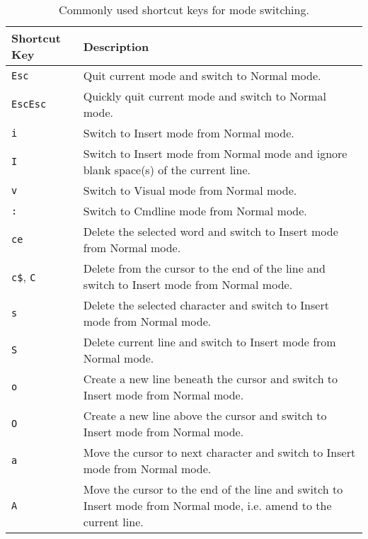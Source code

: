 \documentclass[a4paper]{article}
\begin{document}
\begin{table}
  \centering \caption{Commonly used shortcut keys for mode switching.}\label{tab:SKeyModeSwitch}
  \begin{tabularx}{\textwidth}{lX}
    \hline
    Shortcut Key & Description \\ \hline
    \texttt{Esc} & Quit current mode and switch to Normal mode. \\ \hdashline
    \texttt{Esc}\texttt{Esc} & Quickly quit current mode and switch to Normal mode. \\ \hdashline
    \texttt{i} & Switch to Insert mode from Normal mode. \\ \hdashline
    \texttt{I} & Switch to Insert mode from Normal mode and ignore blank space(s) of the current line. \\ \hdashline
    \texttt{v} & Switch to Visual mode from Normal mode. \\ \hdashline
    \texttt{:} & Switch to Cmdline mode from Normal mode. \\ \hdashline
    \texttt{ce} & Delete the selected word and switch to Insert mode from Normal mode. \\ \hdashline
    \texttt{c\$}, \texttt{C} & Delete from the cursor to the end of the line and switch to Insert mode from Normal mode. \\ \hdashline
    \texttt{s} & Delete the selected character and switch to Insert mode from Normal mode. \\ \hdashline
    \texttt{S} & Delete current line and switch to Insert mode from Normal mode. \\ \hdashline
    \texttt{o} & Create a new line beneath the cursor and switch to Insert mode from Normal mode. \\ \hdashline
    \texttt{O} & Create a new line above the cursor and switch to Insert mode from Normal mode. \\ \hdashline
    \texttt{a} & Move the cursor to next character and switch to Insert mode from Normal mode. \\ \hdashline
    \texttt{A} & Move the cursor to the end of the line and switch to Insert mode from Normal mode, i.e. amend to the current line. \\
    \hline
  \end{tabularx}
\end{table}
\end{document}
